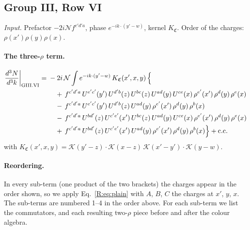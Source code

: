 \documentclass[10pt]{article}
\numberwithin{equation}{section}
\newcommand{\KK}{\mathcal K}
\newcommand{\NN}{\mathcal N}
\begin{document}
\subsection{Group III, Row VI}\label{R:sec:GIII.VI}
\emph{Input.} Prefactor $-2i\NN f^{c'd'a}$, phase $e^{-ik\cdot(y'-w)}$, kernel $K_{\mathfrak C}$. Order of the charges: $\rho(x')\rho(y)\rho(x)$.
\paragraph{The three-$\rho$ term.}
\begin{align}
\frac{d^3N}{d^3k}\bigg|_{\rm GIII.VI}={}&-2i\,\NN\int e^{-ik\cdot(y'-w)}\,K_{\mathfrak C}(x',x,y)\,\Big\{\notag\\
&\quad +\,f^{c'd'a}\,U^{e'c'}(y')\,U^{d'b}(z)\,U^{bc}(z)\,U^{ad}(y)\,U^{ce}(x)\,\rho^{e'}(x')\,\rho^{d}(y)\,\rho^{e}(x)\notag\\
&\quad -\,f^{c'd'a}\,U^{e'c'}(y')\,U^{d'b}(z)\,U^{ad}(y)\,\rho^{e'}(x')\,\rho^{d}(y)\,\rho^{b}(x)\notag\\
&\quad -\,f^{c'd'a}\,U^{bd'}(z)\,U^{c'e'}(x')\,U^{bc}(z)\,U^{ad}(y)\,U^{ce}(x)\,\rho^{e'}(x')\,\rho^{d}(y)\,\rho^{e}(x)\notag\\
&\quad +\,f^{c'd'a}\,U^{bd'}(z)\,U^{c'e'}(x')\,U^{ad}(y)\,\rho^{e'}(x')\,\rho^{d}(y)\,\rho^{b}(x)\Big\}+{\rm c.c.}\label{R:eq:in-GIII.VI}
\end{align}
with $K_{\mathfrak C}(x',x,y)=\KK(y'-z)\cdot\KK(x-z)\,\KK(x'-y')\cdot\KK(y-w)$.
\paragraph{Reordering.} In every sub-term (one product of the two brackets) the charges appear in the order shown, so we apply Eq.~\eqref{R:eq:plain} with $A$, $B$, $C$ the charges at $x'$, $y$, $x$. The sub-terms are numbered 1--4 in the order above. For each sub-term we list the commutators, and each resulting two-$\rho$ piece before and after the colour algebra.
\end{document}
